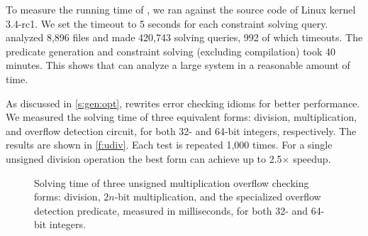 To measure the running time of \sys, we ran \sys against the source
code of Linux kernel 3.4-rc1.  We set the timeout
to 5 seconds for each constraint solving query.   \sys analyzed
8,896 files and made 420,743 solving queries, 992 of which timeouts.
The predicate generation and constraint solving (excluding compilation)
took 40 minutes.  This shows that \sys can analyze a large
system in a reasonable amount of time.

As discussed in \autoref{s:gen:opt}, \sys rewrites error checking
idioms for better performance.  We measured the solving time of three
equivalent forms: division, multiplication, and overflow detection
circuit, for both 32- and 64-bit integers, respectively.  The results
are shown in \autoref{f:udiv}.  Each test is repeated 1,000 times.
For a single unsigned division operation the best form can
achieve up to 2.5$\times$ speedup.

\begin{figure}
\centering

\caption{Solving time of three unsigned multiplication overflow
checking forms: division, $2n$-bit multiplication, and the specialized
overflow detection predicate, measured in milliseconds, for both
32- and 64-bit integers.}
\label{f:udiv}
\end{figure}
